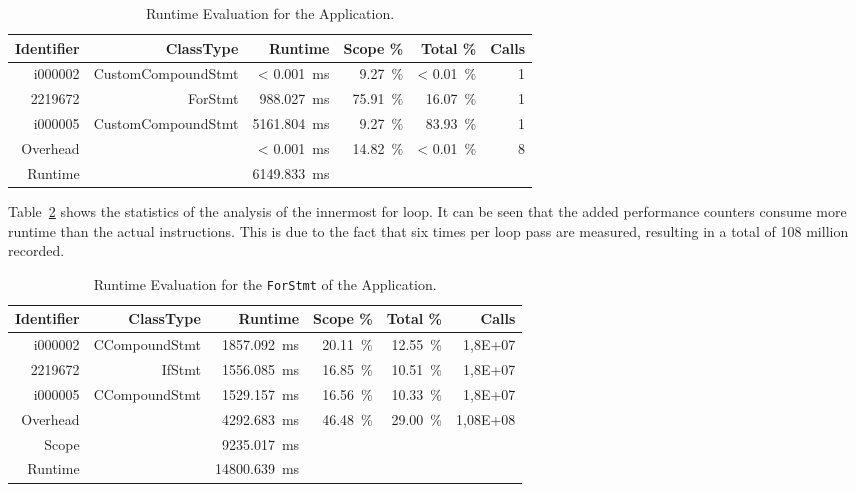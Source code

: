 \begin{table}
  \centering
  \caption{Runtime Evaluation for the \PASSWORDGEN Application.}
  \begin{tabular}{rrrrrr}
    \toprule
    Identifier & ClassType          & Runtime                      & Scope \%             & Total \%              & Calls \\
    \midrule
    i000002    & CustomCompoundStmt & < \SI{0.001}{\milli\second}  & \SI{9.27}{\percent}  & < \SI{0.01}{\percent} & 1     \\
    2219672    & ForStmt            & \SI{988.027}{\milli\second}  & \SI{75.91}{\percent} & \SI{16.07}{\percent}  & 1     \\
    i000005    & CustomCompoundStmt & \SI{5161.804}{\milli\second} & \SI{9.27}{\percent}  & \SI{83.93}{\percent}  & 1     \\
    Overhead   &                    & < \SI{0.001}{\milli\second}  & \SI{14.82}{\percent} & < \SI{0.01}{\percent} & 8     \\
    \midrule
    Runtime    &                    & \SI{6149.833}{\milli\second} &                      &                       &       \\
    \bottomrule
  \end{tabular}
  \label{tab:e:passwordoutput1}
\end{table}

Table~\ref{tab:e:passwordoutput2} shows the statistics of the analysis of the innermost for loop. It can be seen that the added performance counters consume more runtime than the actual instructions. This is due to the fact that six times per loop pass are measured, resulting in a total of 108 million \MEASUREVALUES recorded.

\begin{table}
  \centering
  \caption{Runtime Evaluation for the \lstinline{ForStmt} of the \PASSWORDGEN Application.}
  \begin{tabular}{rrrrrr}
    \toprule
    Identifier & ClassType     & Runtime                       & Scope \%             & Total \%             & Calls    \\
    \midrule
    i000002    & CCompoundStmt & \SI{1857.092}{\milli\second}  & \SI{20.11}{\percent} & \SI{12.55}{\percent} & 1,8E+07  \\
    2219672    & IfStmt        & \SI{1556.085}{\milli\second}  & \SI{16.85}{\percent} & \SI{10.51}{\percent} & 1,8E+07  \\
    i000005    & CCompoundStmt & \SI{1529.157}{\milli\second}  & \SI{16.56}{\percent} & \SI{10.33}{\percent} & 1,8E+07  \\
    Overhead   &               & \SI{4292.683}{\milli\second}  & \SI{46.48}{\percent} & \SI{29.00}{\percent} & 1,08E+08 \\
    \midrule
    Scope      &               & \SI{9235.017}{\milli\second}  &                      &                      &          \\
    Runtime    &               & \SI{14800.639}{\milli\second} &                      &                      &          \\
    \bottomrule
  \end{tabular}
  \label{tab:e:passwordoutput2}
\end{table}

